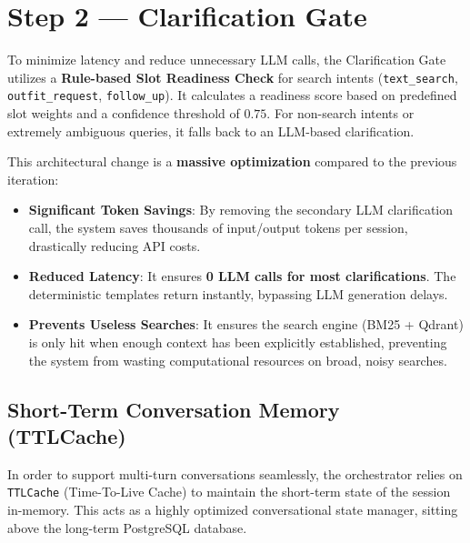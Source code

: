 \section{Step 2 --- Clarification Gate}

\begin{tcolorbox}[title=Method: Rule-Based Slot Readiness \& Hybrid Clarification]
To minimize latency and reduce unnecessary LLM calls, the Clarification Gate utilizes a \textbf{Rule-based Slot Readiness Check} for search intents (\texttt{text\_search}, \texttt{outfit\_request}, \texttt{follow\_up}). It calculates a readiness score based on predefined slot weights and a confidence threshold of $0.75$. For non-search intents or extremely ambiguous queries, it falls back to an LLM-based clarification.
\end{tcolorbox}

\begin{tcolorbox}[colback=green!5,colframe=green!40!black,title=Massive Token \& Latency Optimization]
This architectural change is a \textbf{massive optimization} compared to the previous iteration:
\begin{itemize}
    \item \textbf{Significant Token Savings}: By removing the secondary LLM clarification call, the system saves thousands of input/output tokens per session, drastically reducing API costs.
    \item \textbf{Reduced Latency}: It ensures \textbf{0 LLM calls for most clarifications}. The deterministic templates return instantly, bypassing LLM generation delays.
    \item \textbf{Prevents Useless Searches}: It ensures the search engine (BM25 + Qdrant) is only hit when enough context has been explicitly established, preventing the system from wasting computational resources on broad, noisy searches.
\end{itemize}
\end{tcolorbox}

\subsection{Short-Term Conversation Memory (TTLCache)}
In order to support multi-turn conversations seamlessly, the orchestrator relies on \texttt{TTLCache} (Time-To-Live Cache) to maintain the short-term state of the session in-memory. This acts as a highly optimized conversational state manager, sitting above the long-term PostgreSQL database.

